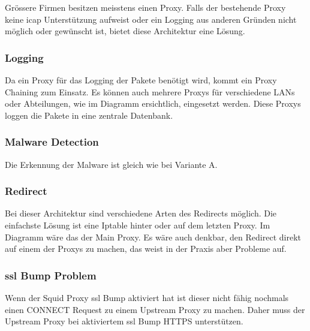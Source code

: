 Grössere Firmen besitzen meisstens einen Proxy. Falls der bestehende Proxy keine \gls{icap} Unterstützung aufweist oder ein Logging aus anderen Gründen nicht möglich oder gewünscht ist, bietet diese Architektur eine Lösung. 

\subsubsection{Logging}
Da ein Proxy für das Logging der Pakete benötigt wird, kommt ein Proxy Chaining zum Einsatz. Es können auch mehrere Proxys für verschiedene LANs oder Abteilungen, wie im Diagramm ersichtlich, eingesetzt werden. Diese Proxys loggen die Pakete in eine zentrale Datenbank.

\subsubsection{Malware Detection}
Die Erkennung der Malware ist gleich wie bei Variante A.

\subsubsection{Redirect}
Bei dieser Architektur sind verschiedene Arten des Redirects möglich. Die einfachste Lösung ist eine Iptable hinter oder auf dem letzten Proxy. Im Diagramm wäre das der Main Proxy. Es wäre auch denkbar, den Redirect direkt auf einem der Proxys zu machen, das weist in der Praxis aber Probleme auf.

\subsubsection{\gls{ssl} Bump Problem}
Wenn der Squid Proxy \gls{ssl} Bump aktiviert hat ist dieser nicht fähig nochmals einen CONNECT Request zu einem Upstream Proxy zu machen.
Daher muss der Upstream Proxy bei aktiviertem \gls{ssl} Bump HTTPS unterstützen.

